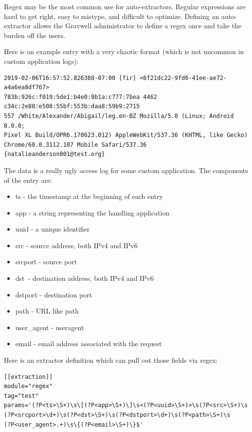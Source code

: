 Regex may be the most common use for auto-extractors. Regular
expressions are hard to get right, easy to mistype, and difficult to
optimize. Defining an auto-extractor allows the Gravwell administrator
to define a regex once and take the burden off the users.

Here is an example entry with a very chaotic format (which is not
uncommon in custom application logs):

\begin{Verbatim}[breaklines=true]
2019-02-06T16:57:52.826388-07:00 [fir] <6f21dc22-9fd6-41ee-ae72-a4a6ea8df767> 
783b:926c:f019:5de1:b4e0:9b1a:c777:7bea 4462 c34c:2e88:e508:55bf:553b:daa8:59b9:2715 
557 /White/Alexander/Abigail/leg.en-BZ Mozilla/5.0 (Linux; Android 8.0.0; 
Pixel XL Build/OPR6.170623.012) AppleWebKit/537.36 (KHTML, like Gecko) 
Chrome/60.0.3112.107 Mobile Safari/537.36 {natalieanderson001@test.org}
\end{Verbatim}

The data is a really ugly access log for some custom application. The
components of the entry are:

\begin{itemize}
\tightlist
\item
  {ts - the timestamp at the beginning of each entry}
\item
  {app - a string representing the handling application}
\item
  {uuid - a unique identifier}
\item
  {src - source address, both IPv4 and IPv6}
\item
  {srcport - source port}
\item
  {dst}{~- destination address, both IPv4 and IPv6}
\item
  {dstport - destination port}
\item
  {path - URL like path}
\item
  {user\_agent - useragent}
\item
  {email - email address associated with the request}
\end{itemize}

Here is an extractor definition which can pull out those fields via
regex:

\begin{Verbatim}[breaklines=true]
[[extraction]]
module="regex"
tag="test"
params='(?P<ts>\S+)\s\[(?P<app>\S+)\]\s<(?P<uuid>\S+)>\s(?P<src>\S+)\s
(?P<srcport>\d+)\s(?P<dst>\S+)\s(?P<dstport>\d+)\s(?P<path>\S+)\s
(?P<user_agent>.+)\s\{(?P<email>\S+)\}$'
\end{Verbatim}

